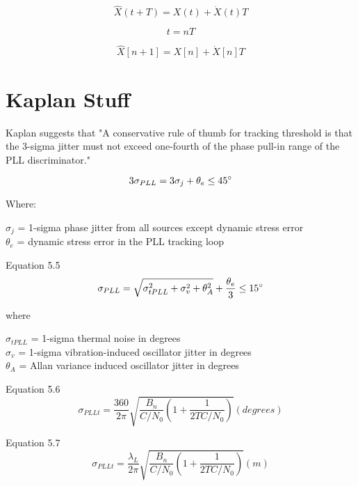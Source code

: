 \begin{equation}
\hat{X}(t+T) = X(t) +  \dot{X}(t) T
\end{equation}

\begin{equation}
t = nT
\end{equation}

\begin{equation}
\hat{X}[n+1] = X[n] +  \dot{X}[n] T
\end{equation}




\section{Kaplan Stuff}
Kaplan suggests that "A conservative rule of thumb for tracking threshold is that the 3-sigma jitter must not exceed one-fourth of the phase pull-in range of the PLL discriminator." \cite{Kaplan}

\begin{equation}
3 \sigma_{PLL} = 3 \sigma_j +\theta_e \leq 45 \degree
\end{equation}

Where:
\begin{framed}
$\sigma_j$ = 1-sigma phase jitter from all sources except dynamic stress error \\
$\theta_e$ = dynamic stress error in the PLL tracking loop
\end{framed}
\cite{Kaplan}

Equation 5.5
\begin{equation}
\sigma_{PLL} = \sqrt{\sigma^2_{tPLL} + \sigma^2_v+ \theta^2_A} + \frac{\theta_e}{3} \leq 15 \degree 
\end{equation}
\cite{Jwo}

where
\begin{framed}
$\sigma_{tPLL}$ = 1-sigma thermal noise in degrees \\
$\sigma_v$ = 1-sigma vibration-induced oscillator jitter in degrees \\
$\theta_A$ = Allan variance induced oscillator jitter in degrees
\end{framed}
\cite{Kaplan}\cite{Jwo}

Equation 5.6
\begin{equation}
\sigma_{PLLt} = \frac{360}{2 \pi} \sqrt{\frac{B_n}{C/N_0}(1+\frac{1}{2TC/N_0})} (degrees)
\end{equation}
\cite{Kaplan}


Equation 5.7
\begin{equation}
\sigma_{PLLt} = \frac{\lambda_L}{2 \pi} \sqrt{\frac{B_n}{C/N_0}(1+\frac{1}{2TC/N_0})} (m)
\end{equation}
\cite{Kaplan}


